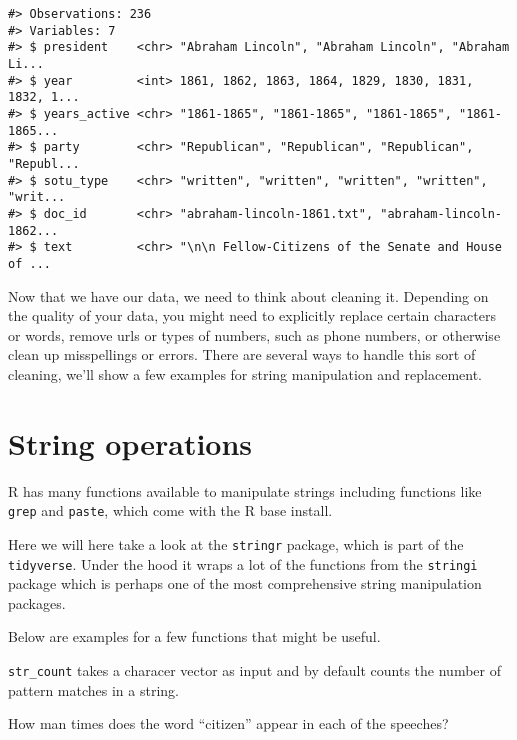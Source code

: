 \documentclass[]{book}
\newenvironment{Shaded}{\begin{snugshade}}{\end{snugshade}}
\newcommand{\CommentTok}[1]{\textcolor[rgb]{0.56,0.35,0.01}{\textit{#1}}}
\newcommand{\KeywordTok}[1]{\textcolor[rgb]{0.13,0.29,0.53}{\textbf{#1}}}
\newcommand{\NormalTok}[1]{#1}
\newcommand{\OperatorTok}[1]{\textcolor[rgb]{0.81,0.36,0.00}{\textbf{#1}}}
\newcommand{\StringTok}[1]{\textcolor[rgb]{0.31,0.60,0.02}{#1}}
\begin{document}
\begin{verbatim}
#> Observations: 236
#> Variables: 7
#> $ president    <chr> "Abraham Lincoln", "Abraham Lincoln", "Abraham Li...
#> $ year         <int> 1861, 1862, 1863, 1864, 1829, 1830, 1831, 1832, 1...
#> $ years_active <chr> "1861-1865", "1861-1865", "1861-1865", "1861-1865...
#> $ party        <chr> "Republican", "Republican", "Republican", "Republ...
#> $ sotu_type    <chr> "written", "written", "written", "written", "writ...
#> $ doc_id       <chr> "abraham-lincoln-1861.txt", "abraham-lincoln-1862...
#> $ text         <chr> "\n\n Fellow-Citizens of the Senate and House of ...
\end{verbatim}

Now that we have our data, we need to think about cleaning it. Depending on the quality of your data, you might need to explicitly replace certain characters or words, remove urls or types of numbers, such as phone numbers, or otherwise clean up misspellings or errors. There are several ways to handle this sort of cleaning, we'll show a few examples for string manipulation and replacement.

\hypertarget{string-operations}{%
\section{String operations}\label{string-operations}}

R has many functions available to manipulate strings including functions like \texttt{grep} and \texttt{paste}, which come with the R base install.

Here we will here take a look at the \texttt{stringr} package, which is part of the \texttt{tidyverse}. Under the hood it wraps a lot of the functions from the \texttt{stringi} package which is perhaps one of the most comprehensive string manipulation packages.

Below are examples for a few functions that might be useful.

\texttt{str\_count} takes a characer vector as input and by default counts the number of pattern matches in a string.

How man times does the word ``citizen'' appear in each of the speeches?

\begin{Shaded}
\end{Shaded}
\end{document}
